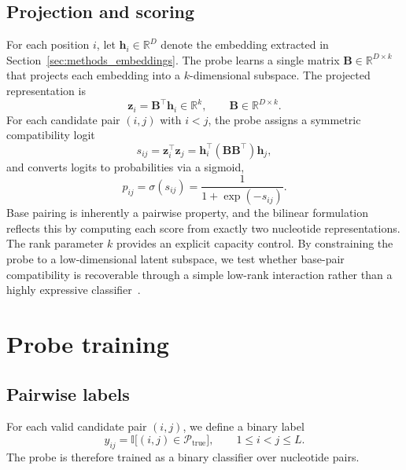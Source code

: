 \documentclass[logo,bsc,singlespacing,parskip]{infthesis}
\begin{document}
\subsection{Projection and scoring}
\label{sec:methods_probe_scoring}
For each position $i$, let $\mathbf{h}_i \in \mathbb{R}^{D}$ denote
the embedding extracted in Section~\ref{sec:methods_embeddings}. The
probe learns a single matrix $\mathbf{B} \in \mathbb{R}^{D \times k}$ that projects each
embedding into a $k$-dimensional subspace. The projected representation is
\begin{equation}
\mathbf{z}_i = \mathbf{B}^{\top}\mathbf{h}_i \in \mathbb{R}^{k},
\qquad
\mathbf{B} \in \mathbb{R}^{D \times k}.
\end{equation}
For each candidate pair $(i,j)$ with $i<j$, the probe assigns a symmetric compatibility logit
\begin{equation}
s_{ij} = \mathbf{z}_i^\top \mathbf{z}_j
       = \mathbf{h}_i^\top (\mathbf{B}\mathbf{B}^\top)\mathbf{h}_j,
\end{equation}
and converts logits to probabilities via a sigmoid,
\begin{equation}
p_{ij} = \sigma(s_{ij}) = \frac{1}{1+\exp(-s_{ij})}.
\end{equation}
Base pairing is inherently a pairwise property, and the bilinear formulation reflects this by computing each score from exactly two nucleotide representations. The rank parameter $k$ provides an explicit capacity control. By constraining the probe to a low-dimensional latent subspace, we test whether base-pair compatibility is recoverable through a simple low-rank interaction rather than a highly expressive classifier~\citep{hewitt2019designing,pimentel2020pareto}.

\section{Probe training}
\label{sec:methods_training}

\subsection{Pairwise labels}
\label{sec:methods_training_labels}

For each valid candidate pair $(i,j)$, we define a binary label
\begin{equation}
y_{ij} = \mathbb{I}\big[(i,j)\in\mathcal{P}_{\mathrm{true}}\big],
\qquad 1 \le i < j \le L.
\end{equation}
The probe is therefore trained as a binary classifier over nucleotide pairs.
\end{document}
